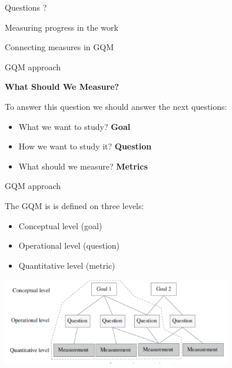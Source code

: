 \documentclass{beamer}
\begin{document}
\begin{frame}{\centerline{}}

\begin{center}
{\Large
Questions ?
}
\end{center}


\end{frame}

\begin{frame}{\centerline{Measuring progress in the work}}
\begin{center}
{\Large
Connecting measures in GQM
}
\end{center}
\end{frame}

\begin{frame}{\centerline{GQM approach}}

\textbf{What Should We Measure?}
\newline 

To answer this question we should answer the next questions:

\begin{itemize}
\item  What we want to study?   \textbf{Goal}
\item  How we want to study it? \textbf{Question}
\item   What should we measure? \textbf{Metrics}
\end{itemize}







\end{frame}

\begin{frame}{\centerline{GQM approach}}

The GQM is is defined on three levels:
\begin{itemize}

\item  Conceptual level (goal)
\item  Operational level (question)
\item  Quantitative level (metric)

\end{itemize}

\begin{center}
\includegraphics[width=100mm]{A2022.IDSEPC.SperimentazioneDeduzione/image-02.png}
\end{center}
\end{frame}
\end{document}
